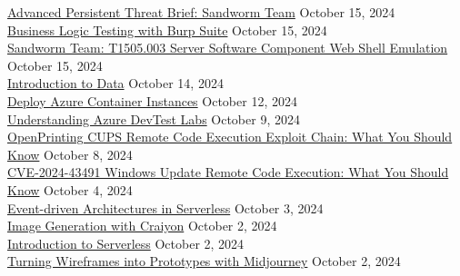 \documentclass[10pt]{res} %
\begin{document}
\begin{resume}
\href{https://bjdelacruz.dev/files/certificates/pluralsight/Advanced_Persistent_Threat_Brief_-_Sandworm_Team.pdf}{\color{blue}Advanced Persistent Threat Brief: Sandworm Team} \hfill October 15, 2024 \\
\href{https://bjdelacruz.dev/files/certificates/pluralsight/Business_Logic_Testing_with_Burp_Suite.pdf}{\color{blue}Business Logic Testing with Burp Suite} \hfill October 15, 2024 \\
\href{https://bjdelacruz.dev/files/certificates/pluralsight/Sandworm_Team_-_T1505-003_Server_Software_Component_Web_Shell_Emulation.pdf}{\color{blue}Sandworm Team: T1505.003 Server Software Component Web Shell Emulation} \hfill October 15, 2024 \\
\href{https://bjdelacruz.dev/files/certificates/pluralsight/Introduction_to_Data.pdf}{\color{blue}Introduction to Data} \hfill October 14, 2024 \\
\href{https://bjdelacruz.dev/files/certificates/pluralsight/Deploy_Azure_Container_Instances.pdf}{\color{blue}Deploy Azure Container Instances} \hfill October 12, 2024 \\
\href{https://bjdelacruz.dev/files/certificates/pluralsight/Understanding_Azure_DevTest_Labs.pdf}{\color{blue}Understanding Azure DevTest Labs} \hfill October 9, 2024 \\
\href{https://bjdelacruz.dev/files/certificates/pluralsight/OpenPrinting_CUPS_Remote_Code_Execution_Exploit_Chain_-_What_You_Should_Know.pdf}{\color{blue}OpenPrinting CUPS Remote Code Execution Exploit Chain: What You Should Know} \hfill October 8, 2024 \\
\href{https://bjdelacruz.dev/files/certificates/pluralsight/CVE-2024-43491_Windows_Update_Remote_Code_Execution_-_What_You_Should_Know.pdf}{\color{blue}CVE-2024-43491 Windows Update Remote Code Execution: What You Should Know} \hfill October 4, 2024 \\
\href{https://bjdelacruz.dev/files/certificates/pluralsight/Event-driven_Architectures_in_Serverless.pdf}{\color{blue}Event-driven Architectures in Serverless} \hfill October 3, 2024 \\
\href{https://bjdelacruz.dev/files/certificates/pluralsight/Image_Generation_with_Craiyon.pdf}{\color{blue}Image Generation with Craiyon} \hfill October 2, 2024 \\
\href{https://bjdelacruz.dev/files/certificates/pluralsight/Introduction_to_Serverless.pdf}{\color{blue}Introduction to Serverless} \hfill October 2, 2024 \\
\href{https://bjdelacruz.dev/files/certificates/pluralsight/Turning_Wireframes_into_Prototypes_with_Midjourney.pdf}{\color{blue}Turning Wireframes into Prototypes with Midjourney} \hfill October 2, 2024 \\

\end{resume}
\end{document}
